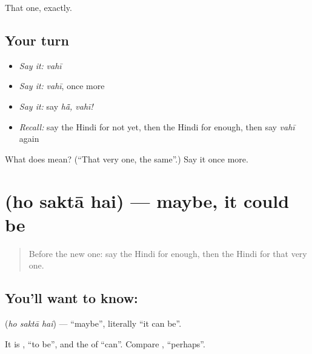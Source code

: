 \begin{grammarlens}[title={What you've built}]
That one, exactly.
\end{grammarlens}

\subsection*{Your turn}
\begin{itemize}
\raggedright
  \item \emph{Say it:} \emph{vahī}
  \item \emph{Say it:} \emph{vahī}, once more
  \item \emph{Say it:} say \emph{hā̃, vahī!}
  \item \emph{Recall:} say the Hindi for not yet, then the Hindi for enough, then say \emph{vahī} again
\end{itemize}

\begin{tcolorbox}[breakable,colback=teal!4,colframe=teal!35!black,title={Before you move on}]
What does  mean? (\textquotedblleft{}That very one, the same\textquotedblright{}.) Say it once more.
\end{tcolorbox}
\section[\texorpdfstring{\hi{हो} \hi{सकता} \hi{है} (ho saktā hai)}{हो सकता है (ho saktā hai)}]{   (ho saktā hai) — maybe, it could be}

\label{lesson:HI-C113-hosakta}



\begin{quote}
Before the new one: say the Hindi for enough, then the Hindi for that very one.
\end{quote}

\subsection*{You'll want to know:   }
\textbf{  } (\emph{ho saktā hai}) — \textquotedblleft{}maybe\textquotedblright{}, literally \textquotedblleft{}it can be\textquotedblright{}.

It is \textbf{}, \textquotedblleft{}to be\textquotedblright{}, and the \textbf{} of \textquotedblleft{}can\textquotedblright{}. Compare \textbf{}, \textquotedblleft{}perhaps\textquotedblright{}.

